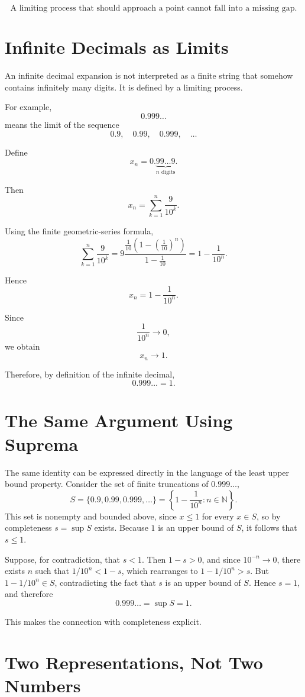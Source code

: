 \documentclass{essay}
\begin{document}
\[
\boxed{
\text{A limiting process that should approach a point cannot fall into a missing gap.}
}
\]

\section{Infinite Decimals as Limits}

An infinite decimal expansion is not interpreted as a finite string that somehow contains infinitely many digits. It is defined by a limiting process.

For example,
\[
0.999\ldots
\]
means the limit of the sequence
\[
0.9,\quad 0.99,\quad 0.999,\quad \ldots
\]

Define
\[
x_n
=
0.\underbrace{99\ldots9}_{n\text{ digits}}.
\]

Then
\[
x_n
=
\sum_{k=1}^{n}\frac{9}{10^k}.
\]

Using the finite geometric-series formula,
\[
\sum_{k=1}^{n}\frac{9}{10^k}
=
9\frac{\frac{1}{10}\left(1-\left(\frac{1}{10}\right)^n\right)}
{1-\frac{1}{10}}
=
1-\frac{1}{10^n}.
\]

Hence
\[
x_n=1-\frac{1}{10^n}.
\]

Since
\[
\frac{1}{10^n}\to0,
\]
we obtain
\[
x_n\to1.
\]

Therefore, by definition of the infinite decimal,
\[
\boxed{0.999\ldots=1}.
\]

\section{The Same Argument Using Suprema}

The same identity can be expressed directly in the language of the least upper bound property. Consider the set of finite truncations of \(0.999\ldots\),
\[
S=\{0.9,0.99,0.999,\ldots\}=\left\{1-\frac{1}{10^n}:n\in\mathbb{N}\right\}.
\]
This set is nonempty and bounded above, since \(x\leq1\) for every \(x\in S\), so by completeness \(s=\sup S\) exists. Because \(1\) is an upper bound of \(S\), it follows that \(s\leq1\).

Suppose, for contradiction, that \(s<1\). Then \(1-s>0\), and since \(10^{-n}\to0\), there exists \(n\) such that \(1/10^n<1-s\), which rearranges to \(1-1/10^n>s\). But \(1-1/10^n\in S\), contradicting the fact that \(s\) is an upper bound of \(S\). Hence \(s=1\), and therefore
\[
0.999\ldots
=
\sup S
=
1.
\]

This makes the connection with completeness explicit.

\section{Two Representations, Not Two Numbers}
\end{document}
